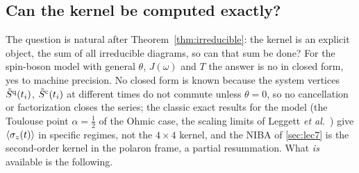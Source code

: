 \subsection{Can the kernel be computed exactly?}
\label{sec:nz-exact}

The question is natural after Theorem~\ref{thm:irreducible}: the kernel is an explicit object, the sum of all irreducible diagrams, so can that sum be done?
For the spin-boson model with general $\theta$, $J(\omega)$ and $T$ the answer is no in closed form, yes to machine precision.
No closed form is known because the system vertices $\tilde S^{\mathrm{q}}(t_i)$, $\tilde S^{\mathrm{c}}(t_i)$ at different times do not commute unless $\theta=0$, so no cancellation or factorization closes the series; the classic exact results for the model (the Toulouse point $\alpha=\tfrac12$ of the Ohmic case, the scaling limits of Leggett \emph{et al.}~\cite{Leggett1987}) give $\langle\sigma_z(t)\rangle$ in specific regimes, not the $4\times4$ kernel, and the NIBA of \cref{sec:lec7} is the second-order kernel in the polaron frame, a partial resummation.
What \emph{is} available is the following.

